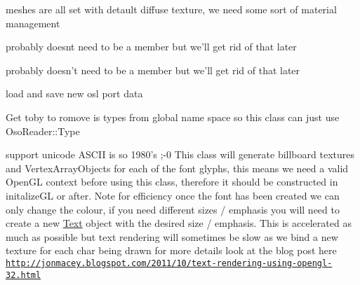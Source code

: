 \begin{DoxyRefList}
meshes are all set with detault diffuse texture, we need some sort of material management  
\item[\label{todo__todo000005}%
\hypertarget{todo__todo000005}{}%
Member \hyperlink{class_path_tracer_scene_a9eff6b99097c6edb6e4da1ab6da1f494}{Path\-Tracer\-Scene\-:\-:m\-\_\-pgram\-\_\-bounding\-\_\-box} ]probably doesnt need to be a member but we'll get rid of that later  
\item[\label{todo__todo000006}%
\hypertarget{todo__todo000006}{}%
Member \hyperlink{class_path_tracer_scene_a50f096b5a5941c50a87fdd8864304852}{Path\-Tracer\-Scene\-:\-:m\-\_\-pgram\-\_\-intersection} ]probably doesn't need to be a member but we'll get rid of that later  
\item[\label{todo__todo000014}%
\hypertarget{todo__todo000014}{}%
Member \hyperlink{class_q_n_e_block_ab7fb118bd4bcf8aa224d03807a6dc315}{Q\-N\-E\-Block\-:\-:load} (Q\-Data\-Stream \&, Q\-Map$<$ quint64, Q\-N\-E\-Port $\ast$ $>$ \&port\-Map)]load and save new osl port data  
\item[\label{todo__todo000010}%
\hypertarget{todo__todo000010}{}%
Member \hyperlink{class_q_n_e_port_aeb3a8a2ac138252d1a0afc2c4f00438f}{Q\-N\-E\-Port\-:\-:variable\-Type} ]Get toby to romove is types from global name space so this class can just use Oso\-Reader\-::\-Type  
\item[\label{todo__todo000007}%
\hypertarget{todo__todo000007}{}%
File \hyperlink{_text_8h}{Text.h} ]support unicode A\-S\-C\-I\-I is so 1980's ;-\/0 This class will generate billboard textures and Vertex\-Array\-Objects for each of the font glyphs, this means we need a valid Open\-G\-L context before using this class, therefore it should be constructed in initalize\-G\-L or after. Note for efficiency once the font has been created we can only change the colour, if you need different sizes / emphasis you will need to create a new \hyperlink{class_text}{Text} object with the desired size / emphasis. This is accelerated as much as possible but text rendering will sometimes be slow as we bind a new texture for each char being drawn for more details look at the blog post here \href{http://jonmacey.blogspot.com/2011/10/text-rendering-using-opengl-32.html}{\tt http\-://jonmacey.\-blogspot.\-com/2011/10/text-\/rendering-\/using-\/opengl-\/32.\-html} 
\end{DoxyRefList}